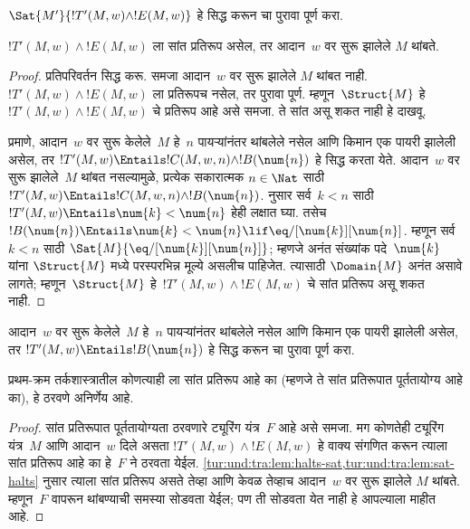 \documentclass[../../../include/open-logic-section]{subfiles}
\begin{document}
\begin{prob}
  $\Sat{M'}{!T'(M,w) \land !E(M,w)}$
  हे सिद्ध करून
  चा पुरावा पूर्ण करा.
\end{prob}

\begin{lem}
  $!T'(M,w) \land !E(M,w)$
  ला सांत प्रतिरूप
  असेल, तर आदान~$w$
  वर सुरू झालेले
  $M$ थांबते.
\end{lem}

\begin{proof}
  प्रतिपरिवर्तन सिद्ध करू.
  समजा आदान~$w$
  वर सुरू झालेले
  $M$ थांबत नाही.
  $!T'(M,w) \land !E(M,w)$
  ला प्रतिरूपच नसेल,
  तर पुरावा पूर्ण.
  म्हणून~$\Struct{M}$
  हे~$!T'(M,w) \land !E(M, w)$
  चे प्रतिरूप आहे
  असे समजा. ते
  सांत असू शकत
  नाही हे दाखवू.
%
  
  प्रमाणे, आदान~$w$
  वर सुरू केलेले~$M$
  हे~$n$ पायऱ्यांनंतर
  थांबलेले नसेल आणि
  किमान एक पायरी
  झालेली असेल, तर
  $!T'(M,w)
  \Entails !C(M, w, n) \land !B(\num{n})$
  हे सिद्ध करता येते.
  आदान~$w$ वर
  सुरू झालेले~$M$
  थांबत नसल्यामुळे,
  प्रत्येक सकारात्मक
  $n \in \Nat$ साठी
  $!T'(M,w) \Entails !C(M, w, n) \land
  !B(\num{n})$.
  नुसार सर्व~$k < n$
  साठी $!T'(M,w) \Entails \num{k} < \num{n}$
  हेही लक्षात घ्या.
  तसेच $!B(\num{n})
  \Entails \num{k} < \num{n} \lif
  \eq/[\num{k}][\num{n}]$.
  म्हणून सर्व~$k < n$
  साठी $\Sat{M}{\eq/[\num{k}][\num{n}]}$;
  म्हणजे अनंत संख्यांक
  पदे~$\num{k}$ यांना
  $\Struct{M}$ मध्ये
  परस्परभिन्न मूल्ये
  असलीच पाहिजेत.
  त्यासाठी $\Domain{M}$
  अनंत असावे लागते;
  म्हणून~$\Struct{M}$
  हे~$!T'(M,w) \land !E(M, w)$
  चे सांत प्रतिरूप
  असू शकत नाही.
%
\end{proof}

\begin{prob}
  आदान~$w$ वर
  सुरू केलेले~$M$
  हे~$n$ पायऱ्यांनंतर
  थांबलेले नसेल आणि
  किमान एक पायरी
  झालेली असेल,
  तर $!T'(M,w) \Entails !B(\num{n})$
  हे सिद्ध करून
  चा पुरावा पूर्ण करा.
\end{prob}

\begin{thm}[ट्राख्टेनब्रोटचे प्रमेय]
  प्रथम-क्रम तर्कशास्त्रातील
  कोणत्याही ला सांत प्रतिरूप
  आहे का (म्हणजे ते
  सांत प्रतिरूपात पूर्ततायोग्य आहे का),
  हे ठरवणे अनिर्णेय आहे.
\end{thm}

\begin{proof}
  सांत प्रतिरूपात पूर्ततायोग्यता ठरवणारे
  ट्यूरिंग यंत्र~$F$
  आहे असे समजा.
  मग कोणतेही ट्यूरिंग
  यंत्र~$M$ आणि
  आदान~$w$ दिले असता
  $!T'(M,w) \land !E(M,w)$
  हे वाक्य संगणित करून
  त्याला सांत प्रतिरूप
  आहे का हे~$F$
  ने ठरवता येईल.
  \cref{tur:und:tra:lem:halts-sat,tur:und:tra:lem:sat-halts}
  नुसार त्याला सांत
  प्रतिरूप असते तेव्हा आणि केवळ तेव्हाच
  आदान~$w$ वर
  सुरू झालेले $M$
  थांबते. म्हणून~$F$
  वापरून थांबण्याची
  समस्या सोडवता येईल;
  पण ती सोडवता येत
  नाही हे आपल्याला
  माहीत आहे.
\end{proof}
\end{document}

